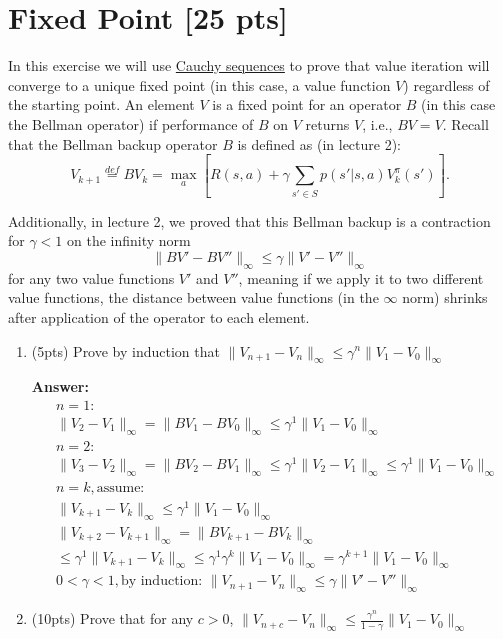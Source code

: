 \section{Fixed Point [25 pts]}

In this exercise we will use  \href{https://en.wikipedia.org/wiki/Cauchy_sequence}{Cauchy sequences}  to prove that value iteration will converge to a unique fixed point (in this case, a value function $V$) regardless of the starting point. An element $V$ is a fixed point for an operator $B$ (in this case the Bellman operator) if performance of $B$ on $V$ returns $V$, i.e., $BV = V$. Recall that the Bellman backup operator $B$ is defined as (in lecture 2):
\begin{equation}
    V_{k+1} \overset{def}{=} BV_{k} = \max_a[ R(s, a) + \gamma\sum_{s' \in S}p(s'|s,a)V^\pi_{k}(s')].
\end{equation}

Additionally, in lecture 2, we proved that this Bellman backup is a contraction for $\gamma < 1$ on the infinity norm
\begin{equation}
    \|BV' - BV''\|_\infty\leq \gamma \|V' - V''\|_\infty
\end{equation}
for any two value functions $V'$ and $V''$, meaning if we apply it to two different value functions, the distance between value functions (in the $\infty$ norm) shrinks after application of the operator to each element.

\begin{enumerate}[label=(\alph*)]
\item (5pts) Prove by induction that $\|V_{n+1} - V_{n}\|_\infty \leq \gamma^n \|V_1 - V_0\|_\infty$

\textbf{Answer:}
\begin{equation}
\begin{aligned}
& n = 1: \\
& \|V_2 - V_1\|_\infty = \|BV_1 - BV_0\|_\infty\leq \gamma^1
\|V_1 - V_0\|_\infty \\
& n = 2: \\
& \|V_3 - V_2\|_\infty = \|BV_2 - BV_1\|_\infty\leq \gamma^1 \|V_2 - V_1\|_\infty \leq \gamma^1 \|V_1 - V_0\|_\infty \\
& n = k, \text{assume:} \\
& \|V_{k+1} - V_k\|_\infty \leq \gamma^1 \|V_1 - V_0\|_\infty \\
& \|V_{k+2} - V_{k+1}\|_\infty = \|BV_{k+1} - BV_k\|_\infty \\
& \leq \gamma^1\|V_{k+1} - V_k\|_\infty \leq \gamma^1 \gamma^k \|V_1 - V_0\|_\infty = \gamma^{k+1} \|V_1 - V_0\|_\infty \\
& 0 < \gamma < 1, \text{by induction: } \|V_{n+1} - V_{n}\|_\infty \leq \gamma \|V' - V''\|_\infty
\end{aligned}
\end{equation}


\item (10pts) Prove that for any $c>0$, $\|V_{n+c} - V_n\|_\infty \leq \frac{\gamma^n}{1-\gamma}\|V_1 - V_0\|_\infty$
\end{enumerate}


